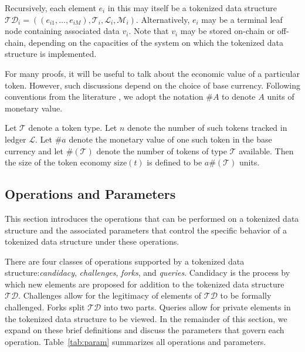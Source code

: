 \documentclass{llncs}
\begin{document}
Recursively, each element $e_i$ in this may itself be a tokenized data structure $\mathcal{TD}_i = ((e_{i1}, \dotsc, e_{iM}), \mathcal{T}_i, \mathcal{L}_i, \mathcal{M}_i)$.  Alternatively, $e_i$ may be a terminal leaf node containing associated data $v_i$. Note that $v_i$ may be stored on-chain or off-chain, depending on the capacities of the system on which the tokenized data structure is implemented.

For many proofs, it will be useful to talk about the economic value of a particular token. However, such discussions depend on the choice of base currency. Following conventions from the literature \cite{gorbunov2015democoin}, we adopt the notation $\#A$ to denote $A$ units of monetary value.


\begin{definition}
Let $\mathcal{T}$ denote a token type. Let $n$ denote the number of such tokens tracked in ledger $\mathcal{L}$. Let $\#a$ denote the monetary value of one such token in the base currency and let $\#(\mathcal{T})$ denote the number of tokens of type $\mathcal{T}$ available. Then the size of the token economy $\text{size}(t)$ is defined to be $a\#(\mathcal{T})$ units.
\end{definition}


\subsection{Operations and Parameters}


This section introduces the operations that can be performed on a tokenized data structure and the associated parameters that control the specific behavior of a tokenized data structure under these operations.

There are four classes of operations supported by a tokenized data structure:\textit{candidacy}, \textit{challenges}, \textit{forks}, and \textit{queries}. Candidacy is the process by which new elements are proposed for addition to the tokenized data structure $\mathcal{TD}$. Challenges allow for the legitimacy of elements of $\mathcal{TD}$ to be formally challenged. Forks split $\mathcal{TD}$ into two parts. Queries allow for private elements in the tokenized data structure to be viewed. In the remainder of this section, we expand on these brief definitions and discuss the parameters that govern each operation. Table~\ref{tab:param} summarizes all operations and parameters.
\end{document}
